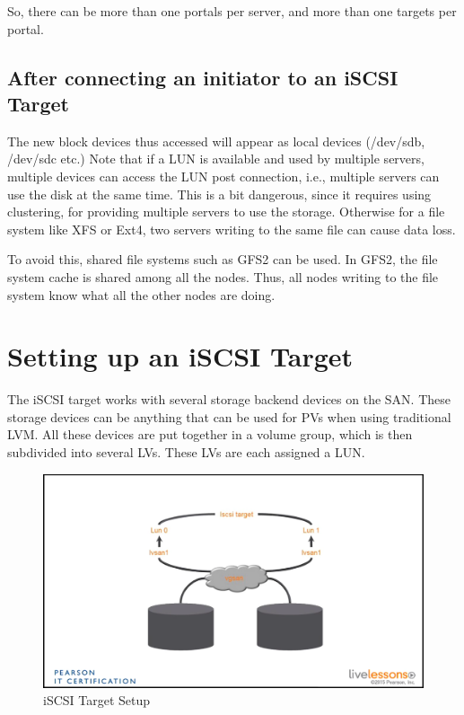 \noindent
So, there can be more than one portals per server, and more than one targets per portal. 

\subsection{After connecting an initiator to an iSCSI Target}
The new block devices thus accessed will appear as local devices (/dev/sdb, /dev/sdc etc.) Note that if a LUN is available and used by multiple servers, multiple devices can access the LUN post connection, i.e., multiple servers can use the disk at the same time. This is a bit dangerous, since it requires using clustering, for providing multiple servers to use the storage. Otherwise for a file system like XFS or Ext4, two servers writing to the same file can cause data loss. 

To avoid this, shared file systems such as GFS2 can be used. In GFS2, the file system cache is shared among all the nodes. Thus, all nodes writing to the file system know what all the other nodes are doing. 

\section{Setting up an iSCSI Target}
The iSCSI target works with several storage backend devices on the SAN. These storage devices can be anything that can be used for PVs when using traditional LVM. All these devices are put together in a volume group, which is then subdivided into several LVs. These LVs are each assigned a LUN. 

\begin{figure}[H]
	\centering
	\includegraphics[width=0.9\linewidth]{RHCE/Mod1/chapters/1.2.a}
	\caption{iSCSI Target Setup}
	\label{fig:1 iSCSI Target Setup}
\end{figure}

